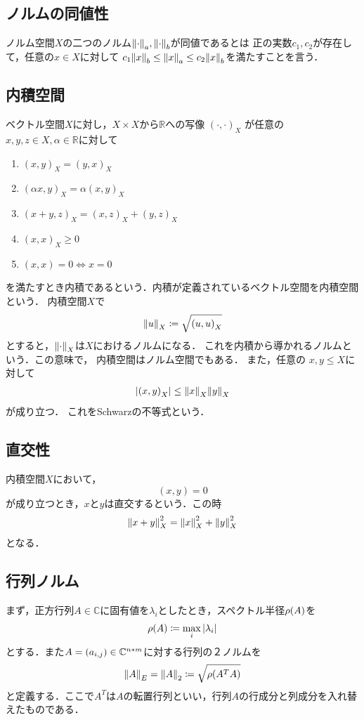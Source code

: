 \subsection{ノルムの同値性}
ノルム空間\(X\)の二つのノルム\({\norm{\cdot}}_a,{\norm{\cdot}}_b\)が同値であるとは
正の実数\(c_1,c_2\)が存在して，任意の\(x\in X\)に対して
\(c_1{\norm{x}}_b\leq {\norm{x}}_a \leq c_2{\norm{x}}_b\)を満たすことを言う．

\subsection{内積空間}%
ベクトル空間\(X\)に対し，\(X \times X \)から\(\mathbb{R}\)への写像
\({(\cdot, \cdot)}_X\) が任意の \(x,y,z \in X, \alpha \in \mathbb{R} \)に対して
\begin{enumerate}[1.]
    \item \( {(x,y)}_X={(y,x)}_X \)
    \item \( {(\alpha x, y)}_X = \alpha{(x, y)}_X \)
    \item \({(x + y, z)}_X = {(x, z)}_X + {(y, z)}_X\)
    \item \( {(x, x)}_X \geq 0 \)
    \item \( (x, x) = 0 \Leftrightarrow x = 0 \)
\end{enumerate}
を満たすとき内積であるという．内積が定義されているベクトル空間を内積空間という．
内積空間\(X\)で
\begin{align}
    {\norm{ u }}_X \coloneqq \sqrt{{(u,u)}_X}
\end{align}
とすると，\({\norm{\cdot}}_X\)は\(X\)におけるノルムになる．
これを内積から導かれるノルムという．この意味で，
内積空間はノルム空間でもある．
また，任意の \(x, y \leq X \)に対して
\begin{align}
  |\qty(x,y)_X| \leq \norm{x}_X \norm{y}_X
\end{align}
が成り立つ．
これをSchwarzの不等式という．
\subsection{直交性}
内積空間\(X\)において，
\begin{equation}
  (x,y)=0
\end{equation}
が成り立つとき，\(x\)と\(y\)は直交するという．この時
\begin{equation}
  {\norm{x+y}}^2_X=\norm{x}^2_X + \norm{y}^2_X
\end{equation}
となる．
\subsection{行列ノルム}
まず，正方行列\(A\in \mathbb{C}\)に固有値を\(\lambda_i\)としたとき，スペクトル半径\(\rho\qty(A)\)を
\begin{align}
   \rho\qty(A) \coloneqq \max_i \qty|\lambda_i|
\end{align}
とする．また\(A = \qty(a_{i,j})\in \mathbb{C}^{n*m}\)に対する行列の２ノルムを
\begin{align}
   \norm{A}_E=\norm{A}_2\coloneqq \sqrt{\rho\qty(A^TA)}
\end{align}
と定義する．ここで\(A^T\)は\(A\)の転置行列といい，行列\(A\)の行成分と列成分を入れ替えたものである．
